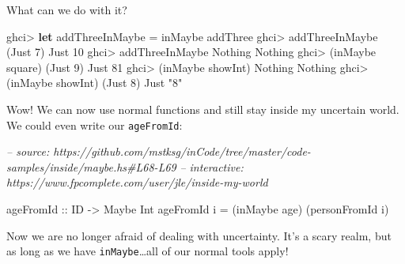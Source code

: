 \documentclass[]{article}
\newenvironment{Shaded}{}{}
\newcommand{\CommentTok}[1]{\textcolor[rgb]{0.38,0.63,0.69}{\textit{#1}}}
\newcommand{\DataTypeTok}[1]{\textcolor[rgb]{0.56,0.13,0.00}{#1}}
\newcommand{\DecValTok}[1]{\textcolor[rgb]{0.25,0.63,0.44}{#1}}
\newcommand{\FunctionTok}[1]{\textcolor[rgb]{0.02,0.16,0.49}{#1}}
\newcommand{\KeywordTok}[1]{\textcolor[rgb]{0.00,0.44,0.13}{\textbf{#1}}}
\newcommand{\NormalTok}[1]{#1}
\newcommand{\OtherTok}[1]{\textcolor[rgb]{0.00,0.44,0.13}{#1}}
\newcommand{\StringTok}[1]{\textcolor[rgb]{0.25,0.44,0.63}{#1}}
\begin{document}
What can we do with it?

\begin{Shaded}
\begin{Highlighting}[]
\NormalTok{ghci}\FunctionTok{>} \KeywordTok{let}\NormalTok{ addThreeInMaybe }\FunctionTok{=}\NormalTok{ inMaybe addThree}
\NormalTok{ghci}\FunctionTok{>}\NormalTok{ addThreeInMaybe (}\DataTypeTok{Just} \DecValTok{7}\NormalTok{)}
\DataTypeTok{Just} \DecValTok{10}
\NormalTok{ghci}\FunctionTok{>}\NormalTok{ addThreeInMaybe }\DataTypeTok{Nothing}
\DataTypeTok{Nothing}
\NormalTok{ghci}\FunctionTok{>}\NormalTok{ (inMaybe square) (}\DataTypeTok{Just} \DecValTok{9}\NormalTok{)}
\DataTypeTok{Just} \DecValTok{81}
\NormalTok{ghci}\FunctionTok{>}\NormalTok{ (inMaybe showInt) }\DataTypeTok{Nothing}
\DataTypeTok{Nothing}
\NormalTok{ghci}\FunctionTok{>}\NormalTok{ (inMaybe showInt) (}\DataTypeTok{Just} \DecValTok{8}\NormalTok{)}
\DataTypeTok{Just} \StringTok{"8"}
\end{Highlighting}
\end{Shaded}

Wow! We can now use normal functions and still stay inside my uncertain world.
We could even write our \texttt{ageFromId}:

\begin{Shaded}
\begin{Highlighting}[]
\CommentTok{-- source: https://github.com/mstksg/inCode/tree/master/code-samples/inside/maybe.hs#L68-L69}
\CommentTok{-- interactive: https://www.fpcomplete.com/user/jle/inside-my-world}

\OtherTok{ageFromId ::} \DataTypeTok{ID} \OtherTok{->} \DataTypeTok{Maybe} \DataTypeTok{Int}
\NormalTok{ageFromId i }\FunctionTok{=}\NormalTok{ (inMaybe age) (personFromId i)}
\end{Highlighting}
\end{Shaded}

Now we are no longer afraid of dealing with uncertainty. It's a scary realm, but
as long as we have \texttt{inMaybe}\ldots{}all of our normal tools apply!
\end{document}
